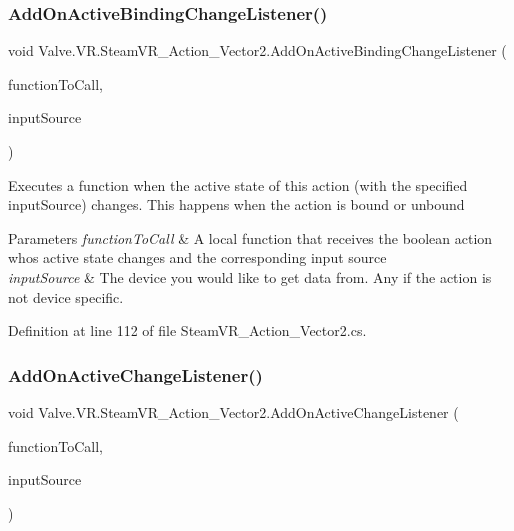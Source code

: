 \subsubsection{\texorpdfstring{AddOnActiveBindingChangeListener()}{AddOnActiveBindingChangeListener()}}
{\footnotesize\ttfamily void Valve.\+V\+R.\+Steam\+V\+R\+\_\+\+Action\+\_\+\+Vector2.\+Add\+On\+Active\+Binding\+Change\+Listener (\begin{DoxyParamCaption}\item[{\mbox{\hyperlink{class_valve_1_1_v_r_1_1_steam_v_r___action___vector2_ad01c83284de71c0d9cd8f7e673ce5ab5}{Active\+Change\+Handler}}}]{function\+To\+Call,  }\item[{\mbox{\hyperlink{namespace_valve_1_1_v_r_a82e5bf501cc3aa155444ee3f0662853f}{Steam\+V\+R\+\_\+\+Input\+\_\+\+Sources}}}]{input\+Source }\end{DoxyParamCaption})}



Executes a function when the active state of this action (with the specified input\+Source) changes. This happens when the action is bound or unbound 


\begin{DoxyParams}{Parameters}
{\em function\+To\+Call} & A local function that receives the boolean action who\textquotesingle{}s active state changes and the corresponding input source\\
\hline
{\em input\+Source} & The device you would like to get data from. Any if the action is not device specific.\\
\hline
\end{DoxyParams}


Definition at line 112 of file Steam\+V\+R\+\_\+\+Action\+\_\+\+Vector2.\+cs.

\mbox{\label{class_valve_1_1_v_r_1_1_steam_v_r___action___vector2_a69cefbe63ef365944127b0ee3ab056c4}} 
\subsubsection{\texorpdfstring{AddOnActiveChangeListener()}{AddOnActiveChangeListener()}}
{\footnotesize\ttfamily void Valve.\+V\+R.\+Steam\+V\+R\+\_\+\+Action\+\_\+\+Vector2.\+Add\+On\+Active\+Change\+Listener (\begin{DoxyParamCaption}\item[{\mbox{\hyperlink{class_valve_1_1_v_r_1_1_steam_v_r___action___vector2_ad01c83284de71c0d9cd8f7e673ce5ab5}{Active\+Change\+Handler}}}]{function\+To\+Call,  }\item[{\mbox{\hyperlink{namespace_valve_1_1_v_r_a82e5bf501cc3aa155444ee3f0662853f}{Steam\+V\+R\+\_\+\+Input\+\_\+\+Sources}}}]{input\+Source }\end{DoxyParamCaption})}



